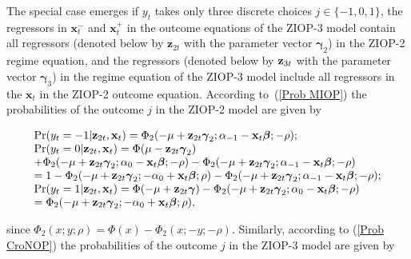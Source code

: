 \documentclass[letterpaper,fleqn,12pt]{article}
\begin{document}
\begin{onehalfspace}
The special case emerges if $y_{t}$ takes only three discrete choices $j\in
\{-1,0,1\}$, the regressors in $\mathbf{x}_{t}^{-}$ and $\mathbf{x}_{t}^{+}$
in the outcome equations of the ZIOP-3 model contain all regressors (denoted
below by $\mathbf{z}_{2t}$ with the parameter vector $\mathbf{\gamma }_{2}$)
in the ZIOP-2 regime equation, and the regressors (denoted below by $\mathbf{%
z}_{3t}$ with the parameter vector $\mathbf{\gamma }_{3}$) in the regime
equation of the ZIOP-3 model include all regressors in the $\mathbf{x}_{t}$
in the ZIOP-2 outcome equation. According to\ (\ref{Prob MIOP}) the
probabilities of the outcome $j$ in the ZIOP-2 model are given by

\begin{flushleft}
\begin{equation}
\begin{array}{l}
\Pr (y_{t}=-1|\mathbf{z}_{2t},\mathbf{x}_{t})=\Phi _{2}(-\mu +\mathbf{z}_{2t}%
\mathbf{\gamma }_{2};\alpha _{-1}-\mathbf{x}_{t}\mathbf{\beta };\mathbf{-}%
\rho ); \\ 
\Pr (y_{t}=0|\mathbf{z}_{2t},\mathbf{x}_{t})=\Phi (\mu -\mathbf{z}_{2t}%
\mathbf{\gamma }_{2}) \\ 
+\Phi _{2}(-\mu +\mathbf{z}_{2t}\mathbf{\gamma }_{2};\alpha _{0}-\mathbf{x}%
_{t}\mathbf{\beta };\mathbf{-}\rho )-\Phi _{2}(-\mu +\mathbf{z}_{2t}\mathbf{%
\gamma }_{2};\alpha _{-1}-\mathbf{x}_{t}\mathbf{\beta };\mathbf{-}\rho ) \\ 
=1-\Phi _{2}(-\mu +\mathbf{z}_{2t}\mathbf{\gamma }_{2};-\alpha _{0}+\mathbf{x%
}_{t}\mathbf{\beta };\rho )-\Phi _{2}(-\mu +\mathbf{z}_{2t}\mathbf{\gamma }%
_{2};\alpha _{-1}-\mathbf{x}_{t}\mathbf{\beta };\mathbf{-}\rho ); \\ 
\Pr (y_{t}=1|\mathbf{z}_{2t},\mathbf{x}_{t})=\Phi (-\mu +\mathbf{z}_{2t}%
\mathbf{\gamma })-\Phi _{2}(-\mu +\mathbf{z}_{2t}\mathbf{\gamma }_{2};\alpha
_{0}-\mathbf{x}_{t}\mathbf{\beta };\mathbf{-}\rho ) \\ 
=\Phi _{2}(-\mu +\mathbf{z}_{2t}\mathbf{\gamma }_{2};-\alpha _{0}+\mathbf{x}%
_{t}\mathbf{\beta };\rho ),%
\end{array}
\label{Prob spec ZIOP-2}
\end{equation}
\end{flushleft}

\noindent since $\Phi _{2}(x;y;\rho )=\Phi (x)-\Phi _{2}(x;-y;-\rho )$.
Similarly, according to (\ref{Prob CroNOP}) the probabilities of the outcome 
$j$ in the ZIOP-3 model are given by


\end{onehalfspace}
\end{document}
